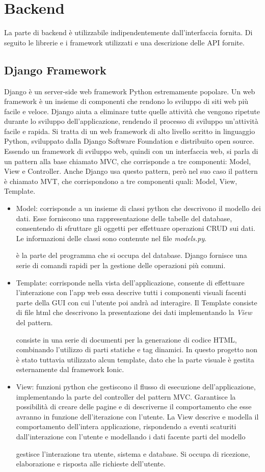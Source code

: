 \documentclass{article}
\begin{document}
\section{Backend}
La parte di backend è utilizzabile indipendentemente dall'interfaccia fornita. Di seguito le librerie e i framework utilizzati e una descrizione delle API fornite. 
\subsection{Django Framework}
Django è un server-side web framework Python estremamente popolare. Un web framework è un insieme di componenti che rendono lo sviluppo di siti web più facile e veloce. 
Django aiuta a eliminare tutte quelle attività che vengono ripetute durante lo sviluppo dell'applicazione, rendendo il processo di sviluppo un'attività facile e rapida. 
Si tratta di un web framework di alto livello scritto in linguaggio Python, sviluppato dalla Django Software Foundation e distribuito open source. 
Essendo un framework di sviluppo web, quindi con un interfaccia web, si parla di un pattern alla base chiamato MVC, che corrisponde a tre componenti: Model, View e Controller.
Anche Django usa questo pattern, però nel suo caso il pattern è chiamato MVT, che corrispondono a tre componenti quali: Model, View, Template.
\begin{itemize}
\item Model: corrisponde a un insieme di classi python che descrivono il modello dei dati. Esse forniscono una rappresentazione delle tabelle del database, consentendo di sfruttare gli oggetti per effettuare operazioni CRUD sui dati. Le informazioni delle classi sono contenute nel file \textit{models.py}.


è la parte del programma che si occupa del database. Django fornisce una serie di comandi rapidi per la gestione delle operazioni più comuni.
\item Template: corrisponde nella vista dell'applicazione, consente di effettuare l'interazione con l'app web essa descrive tutti i componenti visuali facenti parte della GUI con cui l'utente poi andrà ad interagire.
Il Template consiste di file html che descrivono la presentazione dei dati implementando la \textit{View} del pattern. 

consiste in una serie di documenti per la generazione di codice HTML, combinando l'utilizzo di parti statiche e tag dinamici. In questo progetto non è stato tuttavia utilizzato alcun template, dato che la parte visuale è gestita esternamente dal framework Ionic. 
\item View: funzioni python che gestiscono il flusso di esecuzione dell'applicazione, implementando la parte del controller del pattern MVC. Garantisce la possibilità di creare delle pagine e di descriverne il comportamento che esse avranno in funzione dell'iterazione con l'utente.
La View descrive e modella il comportamento dell'intera applicazione, rispondendo a eventi scaturiti dall'interazione con l'utente e modellando i dati facente parti del modello


gestisce l'interazione tra utente, sistema e database. Si occupa di ricezione, elaborazione e risposta alle richieste dell'utente.
\end{itemize}
\end{document}
